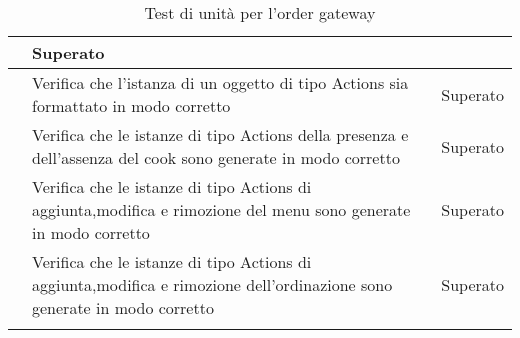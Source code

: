\begin{longtable}{|c|P{9cm}|c|}
	& Superato \\
	\hline{} & Verifica che l'istanza di un oggetto di tipo Actions sia formattato in modo corretto & Superato \\
	\hline{} & Verifica che le istanze di tipo Actions della presenza e dell'assenza del cook sono generate in modo corretto & Superato \\
	\hline{} & Verifica che le istanze di tipo Actions di aggiunta,modifica e rimozione del menu sono generate in modo corretto & Superato \\
	\hline{} & Verifica che le istanze di tipo Actions di aggiunta,modifica e rimozione dell'ordinazione sono generate in modo corretto & Superato \\
	\hline
	\caption{Test di unità per l'order gateway}
\end{longtable}

